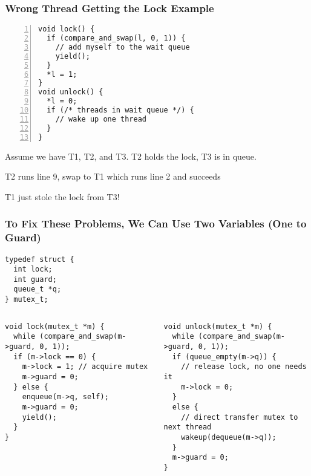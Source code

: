   \begin{frame}[fragile]
    \frametitle{Wrong Thread Getting the Lock Example}

    \begin{lstlisting}[numbers=left]
void lock() {
  if (compare_and_swap(l, 0, 1)) {
    // add myself to the wait queue
    yield();
  }
  *l = 1;
}
void unlock() {
  *l = 0;
  if (/* threads in wait queue */) {
    // wake up one thread
  }
}
    \end{lstlisting}

    Assume we have T1, T2, and T3. T2 holds the lock, T3 is in queue.

    \hspace{2em} T2 runs line 9, swap to T1 which runs line 2 and succeeds

    \hspace{4em} T1 just stole the lock from T3!
  \end{frame}

  \begin{frame}[fragile]
    \frametitle{To Fix These Problems, We Can Use Two Variables (One to Guard)}

    \begin{lstlisting}[xleftmargin=12em]
typedef struct {
  int lock;
  int guard;
  queue_t *q;
} mutex_t;
    \end{lstlisting}

    \begin{columns}
      \begin{column}{0.5\textwidth}
        \begin{lstlisting}
void lock(mutex_t *m) {
  while (compare_and_swap(m->guard, 0, 1));
  if (m->lock == 0) {
    m->lock = 1; // acquire mutex
    m->guard = 0;
  } else {
    enqueue(m->q, self);
    m->guard = 0;
    yield();
  }
}
        \end{lstlisting}
      \end{column}
      \begin{column}{0.5\textwidth}
        \begin{lstlisting}
void unlock(mutex_t *m) {
  while (compare_and_swap(m->guard, 0, 1));
  if (queue_empty(m->q)) {
    // release lock, no one needs it
    m->lock = 0; 
  }
  else {
    // direct transfer mutex to next thread
    wakeup(dequeue(m->q));
  }
  m->guard = 0;
}
        \end{lstlisting}
      \end{column}
    \end{columns}
  \end{frame}

